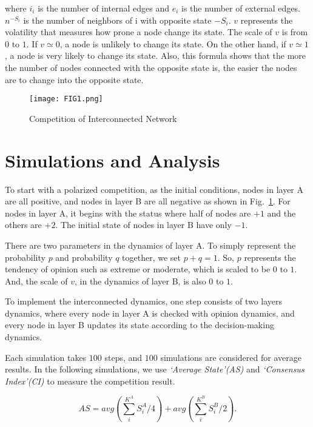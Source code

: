 where $i_i$ is the number of internal edges and $e_i$ is the number of external edges. $n^{-S_i}$ is the number of neighbors of i with opposite state $-S_i$. $v$ represents the volatility that measures how prone a node change its state. The scale of $v$ is from $0$ to $1$. If $v \simeq 0$,  a node is unlikely to change its state. On the other hand, if $v \simeq 1$, a node is very likely to change its state. Also, this formula shows that the more the number of nodes connected with the opposite state is, the easier the nodes are to change into the opposite state.\\
\begin{figure}[!htb]
	\centering
	\texttt{[image: FIG1.png]}
	\caption{Competition of Interconnected Network}
	\label{Fig1}
\end{figure}

\section{Simulations and Analysis}
To start with a polarized competition, as the initial conditions,  nodes in layer A are all positive, and nodes in layer B are all negative as shown in Fig.~\ref{Fig1}. For nodes in layer A, it begins with the status where half of nodes are $+1$ and the others are $+2$. The initial state of nodes in layer B have only $-1$. 

There are two parameters in the dynamics of layer A. To simply represent the probability $p$ and probability $q$ together, we set $p+q=1$. So, $p$ represents the tendency of opinion such as extreme or moderate, which is scaled to be $0$ to $1$. And, the scale of $v$, in the dynamics of layer B, is also $0$ to $1$. 


To implement the interconnected dynamics, one step consists of two layers dynamics, where every node in layer A is checked with opinion dynamics, and every node in layer B updates its state according to the decision-making dynamics.       

Each simulation takes $100$ steps, and $100$ simulations are considered for average results. In the following simulations, we use \textit{`Average State'(AS)} and \textit{`Consensus Index'(CI)} to measure the competition result.

\begin{equation}
AS = avg\left( {\sum\limits_i^{{K^A}} {S_i^A/4} } \right) + avg\left( {\sum\limits_i^{{K^B}} {S_i^B/2} } \right).
\end{equation}

